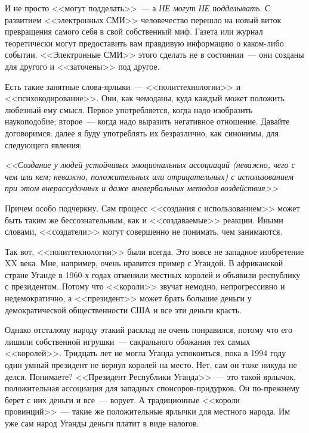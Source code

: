 \documentclass{scrbook}
\newcommand{\flqq}{<<}
\newcommand{\frqq}{>>}
\newcommand{\mdash}{~--- }
\begin{document}
И не просто {\flqq}могут подделать{\frqq}{\mdash}а \emph{НЕ могут НЕ подделывать}. С развитием {\flqq}электронных СМИ{\frqq} человечество перешло на новый виток превращения самого себя в свой собственный миф. Газета или журнал теоретически могут предоставить вам правдивую информацию о каком-либо событии. {\flqq}Электронные СМИ{\frqq} этого сделать не в состоянии{\mdash}они созданы для другого и {\flqq}заточены{\frqq} под другое.

Есть такие занятные слова-ярлыки{\mdash}{\flqq}политтехнологии{\frqq} и {\flqq}психокодирование{\frqq}. Они, как чемоданы, куда каждый может положить любезный ему смысл. Первое употребляется, когда надо изобразить наукоподобие; второе{\mdash}когда надо выразить негативное отношение. Давайте договоримся: далее я буду употреблять их безразлично, как синонимы, для следующего явления:

\emph{{\flqq}Создание у людей устойчивых эмоциональных ассоциаций (неважно, чего с чем или кем; неважно, положительных или отрицательных) с использованием при этом внерассудочных и даже вневербальных методов воздействия{\frqq}}

Причем особо подчеркну. Сам процесс {\flqq}создания с использованием{\frqq} может быть таким же бессознательным, как и {\flqq}создаваемые{\frqq} реакции. Иными словами, {\flqq}создатели{\frqq} могут совершенно не понимать, чем занимаются.

Так вот, {\flqq}политтехнологии{\frqq} были всегда. Это вовсе не западное изобретение XX века. Мне, например, очень нравится пример с Угандой. В африканской стране Уганде в 1960-х годах отменили местных королей и объявили республику с президентом. Потому что {\flqq}короли{\frqq} звучат немодно, непрогрессивно и недемократично, а {\flqq}президент{\frqq} может брать большие деньги у демократической общественности США и все эти деньги красть.

Однако отсталому народу этакий расклад не очень понравился, потому что его лишили собственной игрушки{\mdash}сакрального обожания тех самых {\flqq}королей{\frqq}. Тридцать лет не могла Уганда успокоиться, пока в 1994 году один умный президент не вернул королей на место. Нет, сам он тоже никуда не делся. Понимаете? {\flqq}Президент Республики Уганда{\frqq}{\mdash}это такой ярлычок, положительная ассоциация для западных спонсоров-придурков. Он по-прежнему берет с них деньги и все{\mdash}ворует. А традиционные {\flqq}короли провинций{\frqq}{\mdash}такие же положительные ярлычки для местного народа. Им уже сам народ Уганды деньги платит в виде налогов.
\end{document}
